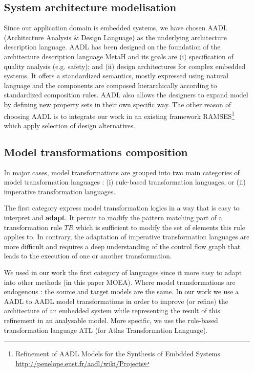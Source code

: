 \documentclass[conference]{IEEEtran}
\begin{document}
\subsection{System architecture modelisation}
Since our application domain is embedded systems, we have chosen AADL (Architecture Analysis \& Design Language) as the underlying architecture description language. AADL has been designed on the foundation of the architecture description language MetaH and its goals are (i) specification of quality analysis (e.g. safety); and (ii) design architectures for complex embedded systems. It offers a standardized semantics, mostly expressed using natural language and the components are composed hierarchically according to standardized composition rules. AADL also allows the designers to expand model by defining new property sets in their own specific way. The other reason of choosing AADL is to integrate our work in an existing framework RAMSES\footnote{Refinement of AADL Models for the Synthesis of Embdded Systems. \url{http://penelope.enst.fr/aadl/wiki/Projects}} which apply selection of design alternatives.

\subsection{Model transformations composition}
\label{transfos}
In major cases, model transformations are grouped into two main categories of model transformation languages : (i) rule-based transformation languages, or (ii) imperative transformation languages\cite{Gorp06integratinga}.

The first category express model transformation logics in a way that is easy to interpret and \textbf{adapt}. It permit to modify the pattern matching part of a transformation rule $TR$ which is sufficient to modify the set of elements this rule applies to. In contrary, the adaptation of imperative transformation languages are more difficult and requires a deep understanding of the control flow graph that leads to the execution of one or another transformation.

We used in our work the first category of languages since it more easy to adapt into other methods (in this paper MOEA). Where model transformations are endogenous : the source and target models are the same. In our work we use a AADL to AADL model transformations in order to improve (or refine) the architecture of an embedded system while representing the result of this refinement in an analysable model. More specific, we use the rule-based transformation language ATL (for Atlas Transformation Language).
\end{document}
